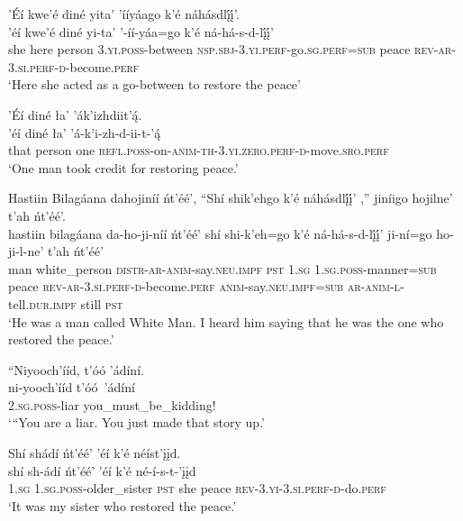 \ea\label{ex:text3-8-2}
’Éí kwe’é diné yita’ ’ííyáago k’é náhásdlį́į́’.\\
\gll ’éí	kwe’é	diné	yi-ta’	’-íí-yáa=go	k’é	ná-há-s-d-lį́į́’\\
     she	here	person	3.\textsc{yi}.\textsc{poss}-between	\textsc{nsp}.\textsc{sbj}-3.\textsc{yi}.\textsc{perf}-go.\textsc{sg}.\textsc{perf}=\textsc{sub}	peace	\textsc{rev}-\textsc{ar}-3.\textsc{si}.\textsc{perf}-\textsc{d}-become.\textsc{perf}\\
\glt `Here she acted as a go-between to restore the peace'
\z

\ea\label{ex:text3-8-3}
’Éí diné ła’ ’ák’izhdiit’ą́.\\
\gll ’éí	diné	ła’	’á-k’i-zh-d-ii-t-’ą́\\
     that	person	one	\textsc{refl}.\textsc{poss}-on-\textsc{anim}-\textsc{th}-3.\textsc{yi}.\textsc{zero}.\textsc{perf}-\textsc{d}-move.\textsc{sro}.\textsc{perf}\\
\glt `One man took credit for restoring peace.'
\z

\ea\label{ex:text3-8-4}
Hastiin Bilagáana dahojiníí ńt’éé’, ``Shí shik’ehgo k’é náhásdlį́į́’ ,'' jiníigo hojilne’ t’ah ńt’éé’.\\
\gll hastiin	bilagáana	da-ho-ji-níí	ńt’éé’	shí	shi-k’eh=go	k’é	ná-há-s-d-lį́į́’	ji-ní=go	ho-ji-l-ne’	t’ah	ńt’éé’\\
     man	white\_person	\textsc{distr}-\textsc{ar}-\textsc{anim}-say.\textsc{neu}.\textsc{impf}	\textsc{pst}	1.\textsc{sg}	1.\textsc{sg}.\textsc{poss}-manner=\textsc{sub}	peace	\textsc{rev}-\textsc{ar}-3.\textsc{si}.\textsc{perf}-\textsc{d}-become.\textsc{perf}	\textsc{anim}-say.\textsc{neu}.\textsc{impf}=\textsc{sub}	\textsc{ar}-\textsc{anim}-\textsc{l}-tell.\textsc{dur}.\textsc{impf}	still	\textsc{pst}\\
\glt `He was a man called White Man. I heard him saying that he was the one who restored the peace.'
\z

\ea\label{ex:text3-8-5}
``Niyooch’ííd, t’óó ’ádíní.\\
\gll ni-yooch’ííd	t’óó~{’ádíní}\\
     2.\textsc{sg}.\textsc{poss}-liar	you\_must\_be\_kidding!\\
\glt `{``}You are a liar. You just made that story up.'
\z

\ea\label{ex:text3-8-6}
Shí shádí ńt’éé’ ’éí k’é néíst’įįd.\\
\gll shí	sh-ádí	ńt’éé’	’éí	k’é	né-í-s-t-’įįd\\
     1.\textsc{sg}	1.\textsc{sg}.\textsc{poss}-older\_sister	\textsc{pst}	she	peace	\textsc{rev}-3.\textsc{yi}-3.\textsc{si}.\textsc{perf}-\textsc{d}-do.\textsc{perf}\\
\glt `It was my sister who restored the peace.'
\z


